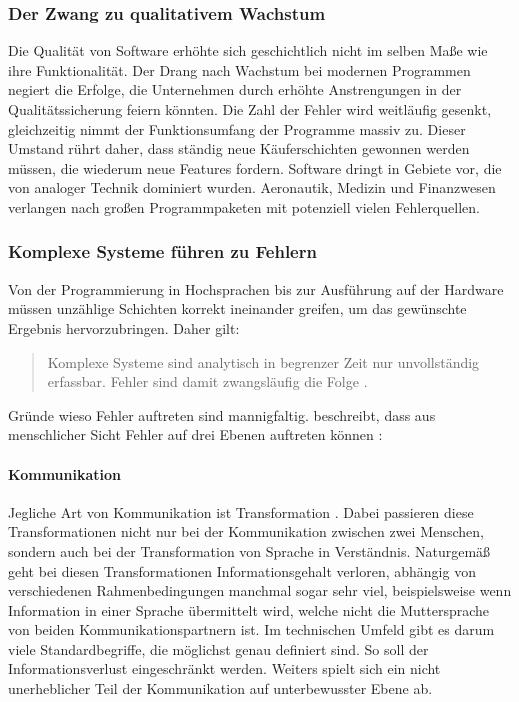 \subsubsection{Der Zwang zu qualitativem Wachstum}
Die Qualität von Software erhöhte sich geschichtlich nicht im selben Maße wie ihre Funktionalität. Der Drang nach Wachstum bei modernen Programmen negiert die Erfolge, die Unternehmen durch erhöhte Anstrengungen in der Qualitätssicherung feiern könnten. Die Zahl der Fehler wird weitläufig gesenkt,  gleichzeitig nimmt der Funktionsumfang der Programme massiv zu. Dieser Umstand rührt daher, dass ständig neue Käuferschichten gewonnen werden müssen, die wiederum neue Features fordern.
Software dringt in Gebiete vor, die von analoger Technik dominiert wurden. Aeronautik, Medizin und Finanzwesen verlangen nach großen Programmpaketen mit potenziell vielen Fehlerquellen.

\subsubsection{Komplexe Systeme führen zu Fehlern}
Von der Programmierung in Hochsprachen bis zur Ausführung auf der Hardware müssen unzählige Schichten korrekt ineinander greifen, um das gewünschte Ergebnis hervorzubringen. 
Daher gilt:

\begin{quote}
Komplexe Systeme sind analytisch in begrenzer Zeit nur unvollständig erfassbar. Fehler sind damit zwangsläufig die Folge \cite{vigenschow_objektorientiertes_2004}.
\end{quote}

Gründe wieso Fehler auftreten sind mannigfaltig. \citeauthor{vigenschow_objektorientiertes_2004} beschreibt, dass aus menschlicher Sicht Fehler auf drei Ebenen auftreten können \cite{vigenschow_objektorientiertes_2004}:

\paragraph{Kommunikation}
Jegliche Art von Kommunikation ist Transformation \cite{shannon_mathematische_1976}. Dabei passieren diese Transformationen nicht nur bei der Kommunikation zwischen zwei Menschen, sondern auch bei der Transformation von Sprache in Verständnis. Naturgemäß geht bei diesen Transformationen Informationsgehalt verloren, abhängig von verschiedenen Rahmenbedingungen manchmal sogar sehr viel, beispielsweise wenn Information in einer Sprache übermittelt wird, welche nicht die Muttersprache von beiden Kommunikationspartnern ist.
Im technischen Umfeld gibt es darum viele Standardbegriffe, die möglichst genau definiert sind. So soll der Informationsverlust eingeschränkt werden.
Weiters spielt sich ein nicht unerheblicher Teil der Kommunikation auf unterbewusster Ebene ab.

